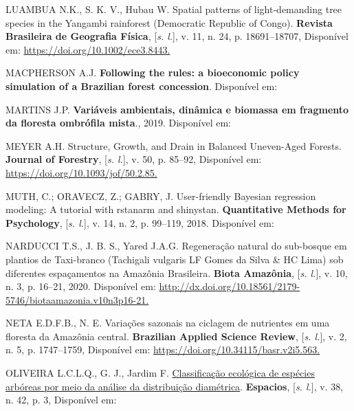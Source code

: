 \documentclass[
]{article}
\newlength{\cslhangindent}
\newlength{\cslentryspacingunit} %
\newenvironment{CSLReferences}[2] %
 {%
  \setlength{\parindent}{0pt}
  \ifodd #1
  \let\oldpar\par
  \def\par{\hangindent=\cslhangindent\oldpar}
  \fi
  \setlength{\parskip}{#2\cslentryspacingunit}
 }%
 {}
\begin{document}
\begin{CSLReferences}{0}{1}
\leavevmode{}%
LUAMBUA N.K., S. K. V., Hubau W. Spatial patterns of light‐demanding
tree species in the Yangambi rainforest (Democratic Republic of Congo).
\textbf{Revista Brasileira de Geografia Física}, {[}\emph{s. l.}{]}, v.
11, n. 24, p. 18691--18707, Disponível em:
\href{https://doi.org/10.1002/ece3.8443}{https://doi.org/10.1002/ece3.8443.
}

\leavevmode{}%
MACPHERSON A.J. \textbf{Following the rules: a bioeconomic policy
simulation of a Brazilian forest concession}. Disponível em:

\leavevmode{}%
MARTINS J.P. \textbf{Variáveis ambientais, dinâmica e biomassa em
fragmento da floresta ombrófila mista}., 2019. Disponível em:

\leavevmode{}%
MEYER A.H. Structure, Growth, and Drain in Balanced Uneven-Aged Forests.
\textbf{Journal of Forestry}, {[}\emph{s. l.}{]}, v. 50, p. 85--92,
Disponível em:
\href{https://doi.org/10.1093/jof/50.2.85}{https://doi.org/10.1093/jof/50.2.85.
}

\leavevmode{}%
MUTH, C.; ORAVECZ, Z.; GABRY, J. User-friendly Bayesian regression
modeling: A tutorial with rstanarm and shinystan. \textbf{Quantitative
Methods for Psychology}, {[}\emph{s. l.}{]}, v. 14, n. 2, p. 99--119,
2018. Disponível em:

\leavevmode{}%
NARDUCCI T.S., J. B. S., Yared J.A.G. Regeneração natural do sub-bosque
em plantios de Taxi-branco (Tachigali vulgaris LF Gomes da Silva \& HC
Lima) sob diferentes espaçamentos na Amazônia Brasileira. \textbf{Biota
Amazônia}, {[}\emph{s. l.}{]}, v. 10, n. 3, p. 16--21, 2020. Disponível
em:
\href{http://dx.doi.org/10.18561/2179-5746/biotaamazonia.v10n3p16-21}{http://dx.doi.org/10.18561/2179-5746/biotaamazonia.v10n3p16-21.
}

\leavevmode{}%
NETA E.D.F.B., N. E. Variações sazonais na ciclagem de nutrientes em uma
floresta da Amazônia central. \textbf{Brazilian Applied Science Review},
{[}\emph{s. l.}{]}, v. 2, n. 5, p. 1747--1759, Disponível em:
\href{https://doi.org/10.34115/basr.v2i5.563}{https://doi.org/10.34115/basr.v2i5.563.
}

\leavevmode{}%
OLIVEIRA L.C.L.Q., G. J., Jardim F. \href{}{Classificação ecológica de
espécies arbóreas por meio da análise da distribuição diamétrica}.
\textbf{Espacios}, {[}\emph{s. l.}{]}, v. 38, n. 42, p. 3, Disponível
em:


\end{CSLReferences}
\end{document}
